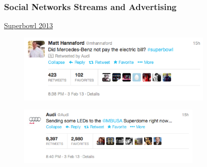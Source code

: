 \documentclass[14pt]{beamer}
\begin{document}
\begin{frame}\frametitle{Social Networks Streams and Advertising}

{\underline{Superbowl 2013}}

\begin{figure}
\centering
\includegraphics[height=1.30in]{mercedez}
\end{figure}
\vspace{-0.1in}
\begin{figure}
\centering
\includegraphics[height=1.10in]{audi}
\end{figure}

\end{frame}





%
%
%
\end{document}
